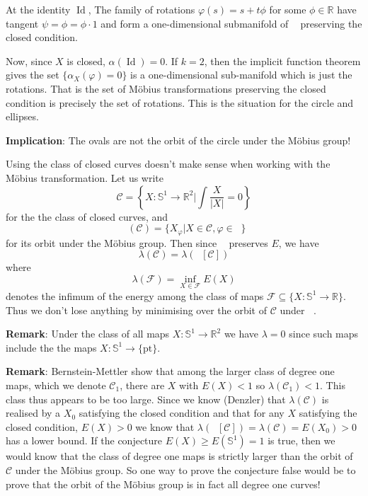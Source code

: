 \documentclass[12pt, a4paper]{amsart}
\theoremstyle{remark}
\newcommand{\R}{\mathbb{R}}
\newcommand{\So}{\mathbb{S}^1}
\DeclareMathOperator{\mob}{M\ddot{o}b}
\newcommand{\mobius}{M\"obius}
\DeclareMathOperator{\id}{Id}
\begin{document}
At the identity \(\id\), The family of rotations \(\varphi(s) = s + t\phi\) for some \(\phi \in \mathbb{R}\) have tangent \(\psi = \phi = \phi \cdot 1\) and form a one-dimensional submanifold of \(\mob\) preserving the closed condition.

Now, since \(X\) is closed, \(\alpha(\id) = 0\). If \(k = 2\), then the implicit function theorem gives the set \(\{\alpha_X(\varphi) = 0\}\) is a one-dimensional sub-manifold which is just the rotations. That is the set of \mobius{} transformations preserving the closed condition is precisely the set of rotations. This is the situation for the circle and ellipses.

\textbf{Implication}: The ovals are not the orbit of the circle under the \mobius{} group!


Using the class of closed curves doesn't make sense when working with the \mobius{} transformation. Let us write
\[
\mathcal{C} = \left\lbrace X : \So \to \R^2 | \int \frac{X}{|X|} = 0 \right\rbrace
\]
for the the class of closed curves, and
\[
\mob(\mathcal{C}) = \lbrace X_{\varphi} | X \in \mathcal{C}, \varphi \in \mob \rbrace
\]
for its orbit under the \mobius{} group. Then since \(\mob\) preserves \(E\), we have
\[
\lambda(\mathcal{C}) = \lambda(\mob[\mathcal{C}])
\]
where
\[
\lambda(\mathcal{F}) = \inf_{X \in \mathcal{F}} E(X)
\]
denotes the infimum of the energy among the class of maps \(\mathcal{F} \subseteq \{X : \So \to \R\}\). Thus we don't lose anything by minimising over the orbit of \(\mathcal{C}\) under \(\mob\).

\textbf{Remark}: Under the class of all maps \(X: \So \to \R^2\) we have \(\lambda = 0\) since such maps include the the maps \(X : \So \to \lbrace \text{pt} \rbrace\).

\textbf{Remark}: Bernstein-Mettler show that among the larger class of degree one maps, which we denote \(\mathcal{C}_1\), there are \(X\) with \(E(X) < 1\) so \(\lambda(\mathcal{C}_1) < 1\). This class thus appears to be too large. Since we know (Denzler) that \(\lambda(\mathcal{C})\) is realised by a \(X_0\) satisfying the closed condition and that for any \(X\) satisfying the closed condition, \(E(X) > 0\) we know that \(\lambda(\mob[\mathcal{C}]) = \lambda(\mathcal{C}) = E(X_0) > 0\) has a lower bound. If the conjecture \(E(X) \geq E(\So) = 1\) is true, then we would know that the class of degree one maps is strictly larger than the orbit of \(\mathcal{C}\) under the \mobius{} group. So one way to prove the conjecture false would be to prove that the orbit of the \mobius{} group is in fact all degree one curves!
\end{document}
